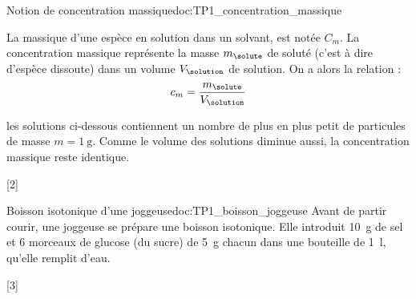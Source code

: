 \begin{doc}{Notion de concentration massique}{doc:TP1_concentration_massique}
  \begin{importants}
    La  massique d’une espèce en solution dans un solvant, est notée $C_m$.
    La concentration massique représente la masse $m_\solute$ de soluté (c'est à dire d'espèce dissoute) dans un volume $V_\solution$ de solution.
    On a alors la relation :
    \begin{equation*}
      c_m = \dfrac{ m_\solute }{ V_\solution }
    \end{equation*}
  \end{importants}

  \exemples les solutions ci-dessous contiennent un nombre de plus en plus petit de particules de masse $m = \qty{1}{\g}$.
  Comme le volume des solutions diminue aussi, la concentration massique reste identique.

\end{doc}

[2]

\begin{doc}{Boisson isotonique d'une joggeuse}{doc:TP1_boisson_joggeuse}
  Avant de partir courir, une joggeuse se prépare une boisson isotonique.
  Elle introduit \qty{10}{\g} de sel  et 6 morceaux de glucose  (du sucre) de \qty{5}{\g} chacun dans une bouteille de \qty{1}{\litre}, qu'elle remplit d'eau.
\end{doc}

[3]

